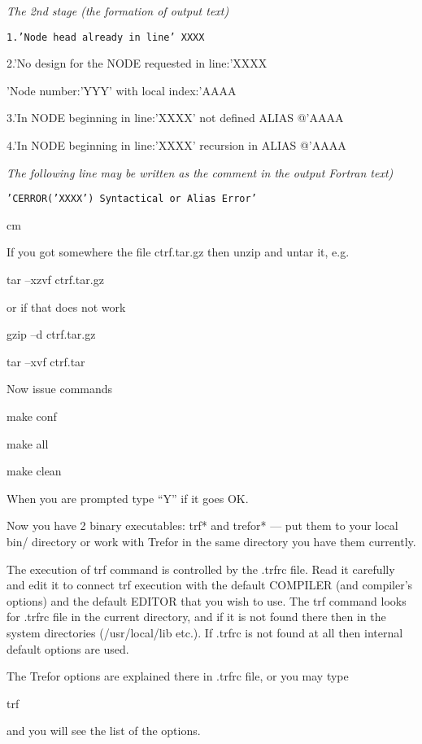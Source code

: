  \bigskip
{\it The 2nd stage (the formation of output text)}

  {\tt   1.'Node head already in line' XXXX

    2.'No design for the NODE requested in line:'XXXX

      'Node number:'YYY' with local index:'AAAA

    3.'In NODE beginning in line:'XXXX' not defined  ALIAS @'AAAA

    4.'In NODE beginning in line:'XXXX' recursion in ALIAS @'AAAA}

 \bigskip
{\it The following line may be written as the comment in the output Fortran text)}

{\tt    'CERROR('XXXX') Syntactical or Alias Error'}

 cm
\vfill\eject


If you got somewhere the file ctrf.tar.gz
then unzip and untar it, e.g.

\qquad \qquad   tar --xzvf ctrf.tar.gz

or if that does not work

\qquad \qquad   gzip --d ctrf.tar.gz

\qquad \qquad   tar --xvf ctrf.tar

Now issue commands

\qquad \qquad   make conf

\qquad \qquad   make all

\qquad \qquad   make clean

When you are prompted type ``Y'' if it goes OK.

Now you have 2 binary executables: trf* and trefor* --- put them
to your local bin/ directory or work with Trefor in the same directory
you have them currently.

The execution of trf command is controlled by the .trfrc file. Read it
carefully and edit it to connect trf execution with the default COMPILER
(and compiler's options) and the default EDITOR that you wish to use.
The trf command looks for .trfrc file in the current directory, and
if it is not found there then in the system directories (/usr/local/lib
etc.). If .trfrc is not found at all then internal default options
are used.

The Trefor
options are explained there in .trfrc file, or you may type

\qquad \qquad   trf

and you will see the list of the options.

